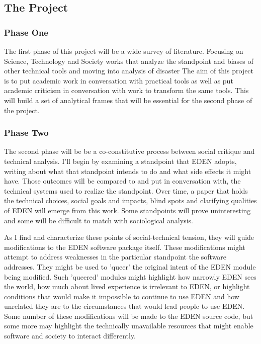 \documentclass[a4paper,man,natbib]{apa6}
\begin{document}
   \subsection*{The Project}
   \subsubsection*{Phase One}
   The first phase of this project will be a wide survey of literature. Focusing on Science, Technology and Society works that analyze the standpoint and biases of other technical tools and moving into analysis of disaster 
   The aim of this project is to put academic work in conversation with practical tools as well as put academic criticism in conversation with work to transform the same tools. This will build a set of analytical frames that will be essential for the second phase of the project.  
   \subsubsection*{Phase Two}
   The second phase will be be a co-constitutive process between social critique and technical analysis. I'll begin by examining a standpoint that \acrshort{EDEN} adopts, writing about what that standpoint intends to do and what side effects it might have. Those outcomes will be compared to and put in conversation with, the technical systems used to realize the standpoint. Over time, a paper that holds the technical choices, social goals and impacts, blind spots and clarifying qualities of \acrshort{EDEN} will emerge from this work. Some standpoints will prove uninteresting and some will be difficult to match with sociological analysis. 

   As I find and characterize these points of social-technical tension, they will guide modifications to the \acrshort{EDEN} software package itself. These modifications might attempt to address weaknesses in the particular standpoint the software addresses. They might be used to 'queer' the original intent of the \acrshort{EDEN} module being modified. Such 'queered' modules might highlight how narrowly \acrshort{EDEN} sees the world, how much about lived experience is irrelevant to \acrshort{EDEN}, or highlight conditions that would make it impossible to continue to use \acrshort{EDEN} and how unrelated they are to the circumstances that would lead people to use \acrshort{EDEN}. Some number of these modifications will be made to the \acrshort{EDEN} source code, but some more may highlight the technically unavailable resources that might enable software and society to interact differently.
\end{document}
